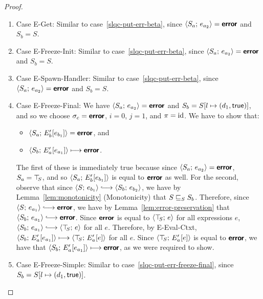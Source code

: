 \begin{proof}
\begin{enumerate}
\begin{enumerate}
    \item \label{slqc-put-err-get}Case {\sc E-Get}: Similar to
      case~\ref{slqc-put-err-beta}, since $\langle S_a;\, e_{a_2} \rangle =
      \textbf{\textsf{error}}$ and $S_b = S$.
    \item \label{slqc-put-err-freeze-init}Case {\sc E-Freeze-Init}:
      Similar to case~\ref{slqc-put-err-beta}, since
      $\langle S_a;\, e_{a_2} \rangle = \textbf{\textsf{error}}$ and $S_b = S$.
    \item \label{slqc-put-err-spawn-handler}Case {\sc
      E-Spawn-Handler}: Similar to case~\ref{slqc-put-err-beta}, since
      $\langle S_a;\, e_{a_2} \rangle = \textbf{\textsf{error}}$ and $S_b = S$.
    \item \label{slqc-put-err-freeze-final}Case {\sc E-Freeze-Final}:
      We have $\langle S_a;\, e_{a_2} \rangle = \textbf{\textsf{error}}$ and $S_b =
      S[l \mapsto (d_1, \textsf{true})]$, and so we choose $\sigma_c =
      \textbf{\textsf{error}}$, $i = 0$, $j = 1$, and $\pi = \mathrm{id}$.  We have to show
      that:
      \begin{itemize}
      \item $\langle S_a;\, E'_b\hspace{-0.5mm}\left[e_{b_1}\right] \rangle = \textbf{\textsf{error}}$,
        and
      \item $\langle S_b;\, E'_a\hspace{-0.5mm}\left[e_{a_1}\right] \rangle \longmapsto
        \textbf{\textsf{error}}$.
      \end{itemize}

      The first of these is immediately true because since
      $\langle S_a;\, e_{a_2} \rangle = \textbf{\textsf{error}}$, $S_a = \top\hspace{-0.85mm}_{S}$, and so
      $\langle S_a;\, E'_b\hspace{-0.5mm}\left[e_{b_1}\right] \rangle$ is equal to $\textbf{\textsf{error}}$ as
      well.  For the second, observe that since $\config{S}{e_{b_1}}
      \parstepsto \config{S_b}{e_{b_2}}$, we have by
      Lemma~\ref{lem:monotonicity} (Monotonicity) that
      $S \sqsubseteq_S S_b$.  Therefore, since $\config{S}{e_{a_1}}
      \parstepsto \error$, we have by
      Lemma~\ref{lem:error-preservation} that $\config{S_b}{e_{a_1}}
      \parstepsto \error$.  Since $\textbf{\textsf{error}}$ is equal to
      $\langle \top\hspace{-0.85mm}_{S};\, e \rangle$ for all expressions $e$,
      $\config{S_b}{e_{a_1}} \parstepsto \config{\topS}{e}$ for all
      $e$.  Therefore, by {\sc E-Eval-Ctxt},
      $\langle S_b;\, E'_a\hspace{-0.5mm}\left[e_{a_1}\right] \rangle \longmapsto
      \langle \top\hspace{-0.85mm}_{S};\, E'_a\hspace{-0.5mm}\left[e\right] \rangle$ for all $e$.  Since
      $\langle \top\hspace{-0.85mm}_{S};\, E'_a\hspace{-0.5mm}\left[e\right] \rangle$ is equal to $\textbf{\textsf{error}}$, we
      have that $\langle S_b;\, E'_a\hspace{-0.5mm}\left[e_{a_1}\right] \rangle \longmapsto
      \textbf{\textsf{error}}$, as we were required to show.

    \item \label{slqc-put-err-freeze-simple}Case {\sc
      E-Freeze-Simple}: Similar to
      case~\ref{slqc-put-err-freeze-final}, since $S_b =
      S[l \mapsto (d_1, \textsf{true})]$.


\end{enumerate}
\end{enumerate}
\end{proof}
